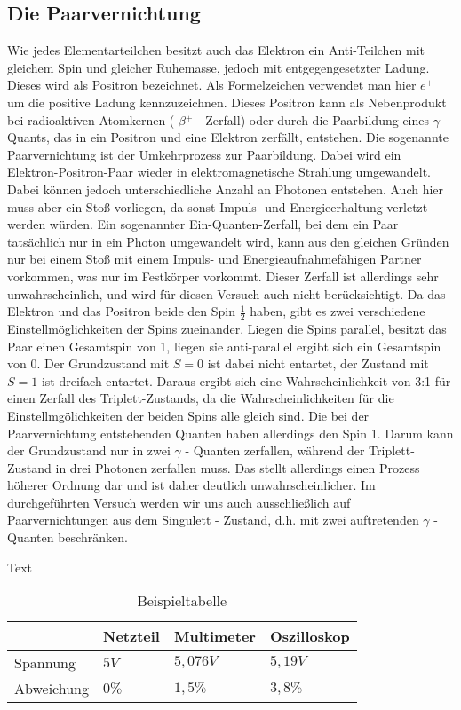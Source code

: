 \documentclass[11pt]{scrartcl}
\begin{document}
\subsection{Die Paarvernichtung}
Wie jedes Elementarteilchen besitzt auch das Elektron ein Anti-Teilchen mit gleichem Spin und gleicher Ruhemasse, jedoch mit entgegengesetzter Ladung. Dieses wird als Positron bezeichnet. Als Formelzeichen verwendet man hier $ e^{+} $ um die positive Ladung kennzuzeichnen. Dieses Positron kann als Nebenprodukt bei radioaktiven Atomkernen ( $\beta {^+} $ - Zerfall) oder durch die Paarbildung eines $\gamma $- Quants, das in ein Positron und eine Elektron zerfällt, entstehen. 
Die sogenannte Paarvernichtung ist der Umkehrprozess zur Paarbildung. Dabei wird ein Elektron-Positron-Paar wieder in elektromagnetische Strahlung umgewandelt. Dabei können jedoch unterschiedliche Anzahl an Photonen entstehen. Auch hier muss aber ein Stoß vorliegen, da sonst Impuls- und Energieerhaltung verletzt werden würden. Ein sogenannter Ein-Quanten-Zerfall, bei dem ein Paar tatsächlich nur in ein Photon umgewandelt wird, kann aus den gleichen Gründen nur bei einem Stoß mit einem Impuls- und Energieaufnahmefähigen Partner vorkommen, was nur im Festkörper vorkommt. Dieser Zerfall ist allerdings sehr unwahrscheinlich, und wird für diesen Versuch auch nicht berücksichtigt. 
Da das Elektron und das Positron beide den Spin $\frac{1}{2}$ haben, gibt es zwei verschiedene Einstellmöglichkeiten der Spins zueinander. Liegen die Spins parallel, besitzt das Paar einen Gesamtspin von 1, liegen sie anti-parallel ergibt sich ein Gesamtspin von 0. Der Grundzustand mit $S=0$ ist dabei nicht entartet, der Zustand mit $S=1$ ist dreifach entartet. Daraus ergibt sich eine Wahrscheinlichkeit von 3:1 für einen Zerfall des Triplett-Zustands, da die Wahrscheinlichkeiten für die Einstellmgölichkeiten der beiden Spins alle gleich sind. Die bei der Paarvernichtung entstehenden Quanten haben allerdings den Spin 1. Darum kann der Grundzustand nur in zwei $\gamma$ - Quanten zerfallen, während der Triplett-Zustand in drei Photonen zerfallen muss. Das stellt allerdings einen Prozess höherer Ordnung dar und ist daher deutlich unwahrscheinlicher. Im durchgeführten Versuch werden wir uns auch ausschließlich auf Paarvernichtungen aus dem Singulett - Zustand, d.h. mit zwei auftretenden $\gamma$ - Quanten beschränken.


Text 

\begin{table}
	\caption{Beispieltabelle}
	\begin{tabular}{|l|l|l|l|}
	\hline
	 & Netzteil & Multimeter & Oszilloskop \\ \hline
	Spannung & $5V$ & $ 5,076 V $ & $ 5,19 V $ \\ \hline
	Abweichung & $0\%$ & $1,5\%$ & $3,8\%$ \\ \hline
	\end{tabular}
\label{tab1}
\end{table}
\end{document}
